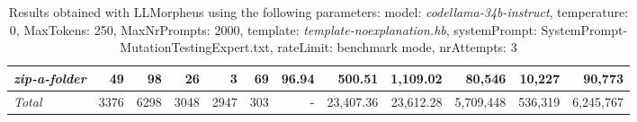 \begin{table*}
{\begin{tabular}{l||r|r|r|r|r|r||r|r||r|r|r}
   \hline
   \textit{zip-a-folder} & 49 & 98 & 26 & 3 & 69 & 96.94 & 500.51 & 1,109.02 & 80,546 & 10,227 & 90,773 \\ 
   \hline
   \textit{Total} & 3376 & 6298 & 3048 & 2947 & 303 & - & 23,407.36  & 23,612.28 & 5,709,448 & 536,319 & 6,245,767 \\ 
 \end{tabular}
 }
 \caption{Results obtained with LLMorpheus using the following parameters: 
   model: \textit{codellama-34b-instruct}, 
   temperature: 0, 
   MaxTokens: 250, 
   MaxNrPrompts: 2000, 
   template: \textit{template-noexplanation.hb}, 
   systemPrompt: SystemPrompt-MutationTestingExpert.txt, 
   rateLimit: benchmark mode, 
   nrAttempts: 3  
 }
\end{table*}


